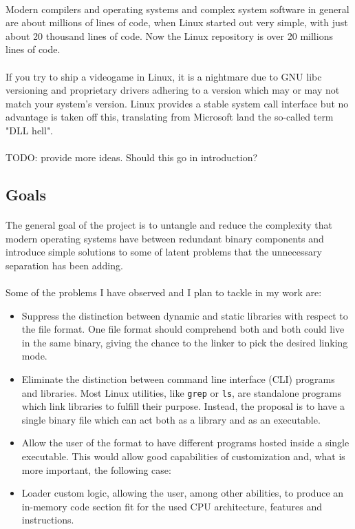 \documentclass[12pt]{article}
\begin{document}
	\paragraph{} Modern compilers and operating systems and complex system software in general are about millions of lines of code, when Linux started out very simple, with just about 20 thousand lines of code. Now the Linux repository is over 20 millions lines of code.
	\paragraph{} If you try to ship a videogame in Linux, it is a nightmare due to GNU libc versioning and proprietary drivers adhering to a version which may or may not match your system's version. Linux provides a stable system call interface but no advantage is taken off this, translating from Microsoft land the so-called term "DLL hell".
	\paragraph{}TODO: provide more ideas. Should this go in introduction?
	\subsection{Goals}
	\paragraph{}The general goal of the project is to untangle and reduce the complexity that modern operating systems have between redundant binary components and introduce simple solutions to some of latent problems that the unnecessary separation has been adding.	
	\paragraph{}Some of the problems I have observed and I plan to tackle in my work are:
	\begin{itemize}
		\item Suppress the distinction between dynamic and static libraries with respect to the file format. One file format should comprehend both and both could live in the same binary, giving the chance to the linker to pick the desired linking mode.
		\item Eliminate the distinction between command line interface (CLI) programs and libraries. Most Linux utilities, like \verb|grep| or \verb|ls|, are standalone programs which link libraries to fulfill their purpose. Instead, the proposal is to have a single binary file which can act both as a library and as an executable.

		\item Allow the user of the format to have different programs hosted inside a single executable. This would allow good capabilities of customization and, what is more important, the following case:
		\item Loader custom logic, allowing the user, among other abilities, to produce an in-memory code section fit for the used CPU architecture, features and instructions.
	\end{itemize}
\end{document}

